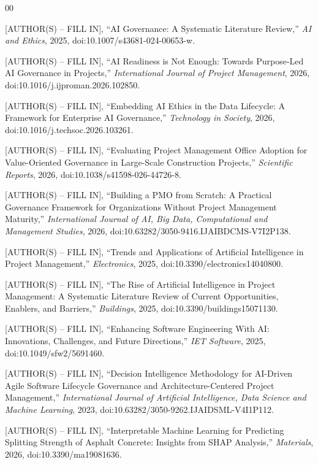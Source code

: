 \documentclass[conference]{IEEEtran}
\begin{document}
\begin{thebibliography}{00}

 [AUTHOR(S) -- FILL IN], ``AI Governance: A Systematic Literature Review,'' \emph{AI and Ethics}, 2025, doi:10.1007/s43681-024-00653-w.

 [AUTHOR(S) -- FILL IN], ``AI Readiness is Not Enough: Towards Purpose-Led AI Governance in Projects,'' \emph{International Journal of Project Management}, 2026, doi:10.1016/j.ijproman.2026.102850.

 [AUTHOR(S) -- FILL IN], ``Embedding AI Ethics in the Data Lifecycle: A Framework for Enterprise AI Governance,'' \emph{Technology in Society}, 2026, doi:10.1016/j.techsoc.2026.103261.

 [AUTHOR(S) -- FILL IN], ``Evaluating Project Management Office Adoption for Value-Oriented Governance in Large-Scale Construction Projects,'' \emph{Scientific Reports}, 2026, doi:10.1038/s41598-026-44726-8.

 [AUTHOR(S) -- FILL IN], ``Building a PMO from Scratch: A Practical Governance Framework for Organizations Without Project Management Maturity,'' \emph{International Journal of AI, Big Data, Computational and Management Studies}, 2026, doi:10.63282/3050-9416.IJAIBDCMS-V7I2P138.

 [AUTHOR(S) -- FILL IN], ``Trends and Applications of Artificial Intelligence in Project Management,'' \emph{Electronics}, 2025, doi:10.3390/electronics14040800.

 [AUTHOR(S) -- FILL IN], ``The Rise of Artificial Intelligence in Project Management: A Systematic Literature Review of Current Opportunities, Enablers, and Barriers,'' \emph{Buildings}, 2025, doi:10.3390/buildings15071130.

 [AUTHOR(S) -- FILL IN], ``Enhancing Software Engineering With AI: Innovations, Challenges, and Future Directions,'' \emph{IET Software}, 2025, doi:10.1049/sfw2/5691460.

 [AUTHOR(S) -- FILL IN], ``Decision Intelligence Methodology for AI-Driven Agile Software Lifecycle Governance and Architecture-Centered Project Management,'' \emph{International Journal of Artificial Intelligence, Data Science and Machine Learning}, 2023, doi:10.63282/3050-9262.IJAIDSML-V4I1P112.

 [AUTHOR(S) -- FILL IN], ``Interpretable Machine Learning for Predicting Splitting Strength of Asphalt Concrete: Insights from SHAP Analysis,'' \emph{Materials}, 2026, doi:10.3390/ma19081636.


\end{thebibliography}
\end{document}
